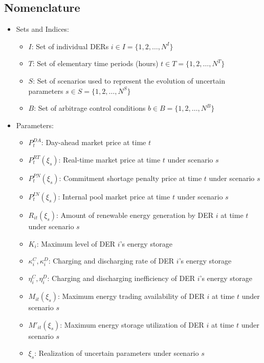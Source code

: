 \documentclass[10pt]{article}
\begin{document}
\subsection{Nomenclature}
\begin{itemize}[leftmargin=*]
    \item Sets and Indices:
    \begin{itemize}[leftmargin=*]\normalsize
        \item $I$: Set of individual DERs $i \in I = \{1,2,\ldots,N^I\}$
        \item $T$: Set of elementary time periods (hours) $t \in T = \{1,2,\ldots,N^T \}$
        \item $S$: Set of scenarios used to represent the evolution of uncertain parameters $s \in S = \{1,2,\ldots,N^S\}$
        \item $B$: Set of arbitrage control conditions $b \in B = \{1,2,\ldots,N^B\}$
    \end{itemize}
    \item Parameters:
    \begin{itemize}[leftmargin=*]\normalsize
        \item $P_{t}^{DA}$: Day-ahead market price at time $t$ 
        \item $P_{t}^{RT}(\xi_s)$: Real-time market price at time $t$ under scenario $s$
        \item $P_{t}^{PN}(\xi_s)$: Commitment shortage penalty price at time $t$ under scenario $s$
        \item $P_{t}^{IN}(\xi_s)$: Internal pool market price at time $t$ under scenario $s$
        \item $R_{it}(\xi_s)$: Amount of renewable energy generation by DER $i$ at time $t$ under scenario $s$
        \item $K_{i}$: Maximum level of DER $i$'s energy storage
        \item $\kappa_{i}^C, \kappa_{i}^D$: Charging and discharging rate of DER $i$'s energy storage
        \item $\eta_{i}^C, \eta_{i}^D$: Charging and discharging inefficiency of DER $i$'s energy storage
        \item $M_{it}(\xi_s)$: Maximum energy trading availability of DER $i$ at time $t$ under scenario $s$
        \item $M'_{it}(\xi_s)$: Maximum energy storage utilization of DER $i$ at time $t$ under scenario $s$
        \item $\xi_s$: Realization of uncertain parameters under scenario $s$ 

\end{itemize}
\end{itemize}
\end{document}
